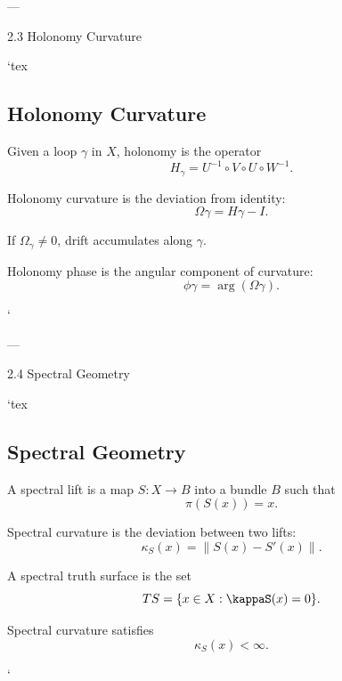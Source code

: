 ---

2.3 Holonomy Curvature

`tex
\subsection{Holonomy Curvature}

\begin{definition}
Given a loop $\gamma$ in $X$, holonomy is the operator
\[
H_\gamma = U^{-1} \circ V \circ U \circ W^{-1}.
\]
\end{definition}

\begin{definition}
Holonomy curvature is the deviation from identity:
\[
\Omega\gamma = H\gamma - I.
\]
\end{definition}

\begin{axiom}
If $\Omega_\gamma \neq 0$, drift accumulates along $\gamma$.
\end{axiom}

\begin{definition}
Holonomy phase is the angular component of curvature:
\[
\phi\gamma = \arg(\Omega\gamma).
\]
\end{definition}
`

---

2.4 Spectral Geometry

`tex
\subsection{Spectral Geometry}

\begin{definition}
A spectral lift is a map $S : X \to B$ into a bundle $B$ such that
\[
\pi(S(x)) = x.
\]
\end{definition}

\begin{definition}
Spectral curvature is the deviation between two lifts:
\[
\kappa_S(x) = \| S(x) - S'(x) \|.
\]
\end{definition}

\begin{definition}
A spectral truth surface is the set
\[
TS = \{ x \in X : \kappaS(x) = 0 \}.
\]
\end{definition}

\begin{axiom}
Spectral curvature satisfies
\[
\kappa_S(x) < \infty.
\]
\end{axiom}
`

